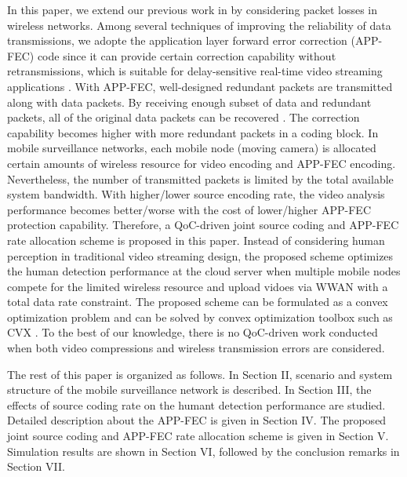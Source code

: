 \documentclass[journal]{IEEEtran}
\begin{document}
In this paper, we extend our previous work in \cite{CHLQ15} by considering packet losses in wireless networks. Among several techniques of improving the reliability of data transmissions, we adopte the application layer forward error correction (APP-FEC) code since it can provide certain correction capability without retransmissions, which is suitable for delay-sensitive real-time video streaming applications \cite{JuFJ09,LuSW08,CHRL15}. With APP-FEC, well-designed redundant packets are transmitted along with data packets. By receiving enough subset of data and redundant packets, all of the original data packets can be recovered \cite{JuFJ09}. The correction capability becomes higher with more redundant packets in a coding block. In mobile surveillance networks, each mobile node (moving camera) is allocated certain amounts of wireless resource for video encoding and APP-FEC encoding. Nevertheless, the number of transmitted packets is limited by the total available system bandwidth. With higher/lower source encoding rate, the video analysis performance becomes better/worse with the cost of lower/higher APP-FEC protection capability. Therefore, a QoC-driven joint source coding and APP-FEC rate allocation scheme is proposed in this paper. Instead of considering human perception in traditional video streaming design, the proposed scheme optimizes the human detection performance at the cloud server when multiple mobile nodes compete for the limited wireless resource and upload vidoes via WWAN with a total data rate constraint. The proposed scheme can be formulated as a convex optimization problem \cite{BoVa04} and can be solved by convex optimization toolbox such as CVX \cite{CVX}. To the best of our knowledge, there is no QoC-driven work conducted when both video compressions and wireless transmission errors are considered.

The rest of this paper is organized as follows. In Section II, scenario and system structure of the mobile surveillance network is described. In Section III, the effects of source coding rate on the humant detection performance are studied. Detailed description about the APP-FEC is given in Section IV. The proposed joint source coding and APP-FEC rate allocation scheme is given in Section V. Simulation results are shown in Section VI, followed by the conclusion remarks in Section VII.
\end{document}
